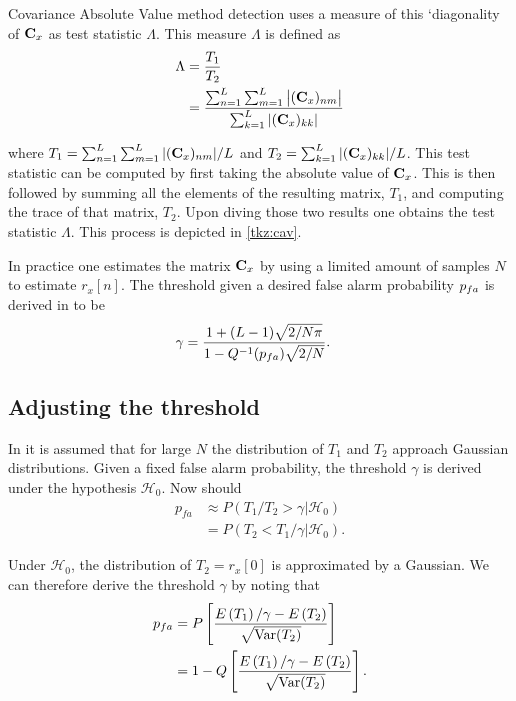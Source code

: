 \documentclass[a4paper, openany, oneside]{memoir}
\begin{document}
Covariance Absolute Value method detection uses a measure of this `diagonality of $\mat{C}_x$ as test statistic $\Lambda$.
This measure $\Lambda$ is defined as
\begin{align}\label{eq:cav_statistic}
\Lambda &= \frac{T_1}{T_2} \nonumber \\
&=\frac{\sum_{n=1}^{L} \sum_{m=1}^L \left|(\mat{C}_x)_{nm}\right|}{\sum_{k=1}^L |(\mat{C}_x)_{kk}|}
\end{align} 

where $T_1 = \sum_{n=1}^{L} \sum_{m=1}^L |(\mat{C}_x)_{nm}|/L$ and
$T_2 = \sum_{k=1}^L |(\mat{C}_x)_{kk}|/L$.
This test statistic can be computed by first taking the absolute value of $\mat{C}_x$. This is then followed by summing all the elements of the resulting matrix, $T_1$, and computing the trace of that matrix, $T_2$. Upon diving those two results one obtains the test statistic $\Lambda$. This process is depicted in \cref{tkz:cav}.

In practice one estimates the matrix $\mat{C}_x$ by using a limited amount of samples $N$ to estimate $r_x[n]$. The threshold given a desired false alarm probability
$p\ss{fa}$ is derived in \cite{zheng2009spectrum} to be
\begin{align*}
\gamma &= \frac{1+(L-1)\sqrt{2/N\pi}}{1-Q^{-1}(p\ss{fa})\sqrt{2/N}}.
\end{align*} 

\subsection{Adjusting the threshold}\label{eq:threshold_cav_deriv}
In \cite{zheng2009spectrum} it is assumed that for large $N$ the distribution of $T_1$ and $T_2$ approach Gaussian distributions. Given a fixed false alarm probability, the threshold $\gamma$ is derived under the hypothesis $\mathcal{H}_0$. Now should
\begin{align*}
p_{fa} &\approx P(T_1/T_2 > \gamma  | \mathcal{H}_0) \\
&= P(T_2 < T_1/\gamma  | \mathcal{H}_0).
\end{align*}

Under $\mathcal{H}_0$, the distribution of $T_2 = r_x[0]$ is approximated by a Gaussian. We can therefore derive the
threshold $\gamma$ by noting that
\begin{align*}
p\ss{fa} &= P\left[\frac{E\left(T_1\right)/\gamma - E\left(T_2\right) }{\sqrt{\text{Var}(T_2)}}\right]\\
&= 1-Q\left[\frac{E\left(T_1\right)/\gamma - E\left(T_2\right) }{\sqrt{\text{Var}(T_2)}}\right].
\end{align*}
\end{document}
